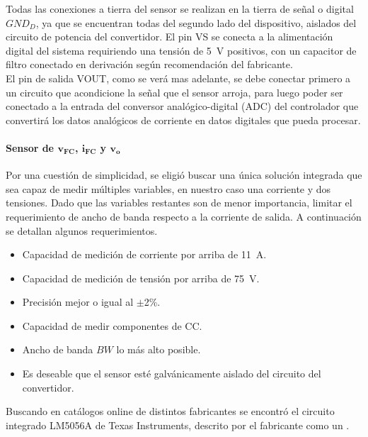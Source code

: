 Todas las conexiones a tierra del sensor se realizan en la tierra de señal o digital $GND_D$, ya que se encuentran todas del segundo lado del dispositivo, aislados del circuito de potencia del convertidor. El pin VS se conecta a la alimentación digital del sistema requiriendo una tensión de \SI[]{5}[]{\volt} positivos, con un capacitor de filtro conectado en derivación según recomendación del fabricante.\\

El pin de salida VOUT, como se verá mas adelante, se debe conectar primero a un circuito que acondicione la señal que el sensor arroja, para luego poder ser conectado a la entrada del conversor analógico-digital (ADC) del controlador que convertirá los datos analógicos de corriente en datos digitales que pueda procesar.\\

\paragraph{Sensor de $\mathbf{v_{FC}}$, $\mathbf{i_{FC}}$ y $\mathbf{v_o}$}

Por una cuestión de simplicidad, se eligió buscar una única solución integrada que sea capaz de medir múltiples variables, en nuestro caso una corriente y dos tensiones. Dado que las variables restantes son de menor importancia, limitar el requerimiento de ancho de banda respecto a la corriente de salida. A continuación se detallan algunos requerimientos.\\

\begin{itemize}
    \item Capacidad de medición de corriente por arriba de \SI[]{11}[]{\ampere}.
    \item Capacidad de medición de tensión por arriba de \SI[]{75}[]{\volt}.
    \item Precisión mejor o igual al $\pm$\num{2}\%.
    \item Capacidad de medir componentes de CC.
    \item Ancho de banda $BW$ lo más alto posible.
    \item Es deseable que el sensor esté galvánicamente aislado del circuito del convertidor.\\
\end{itemize}

Buscando en catálogos online de distintos fabricantes se encontró el {\Medium circuito integrado LM5056A} de Texas Instruments, descrito por el fabricante como un .\\

